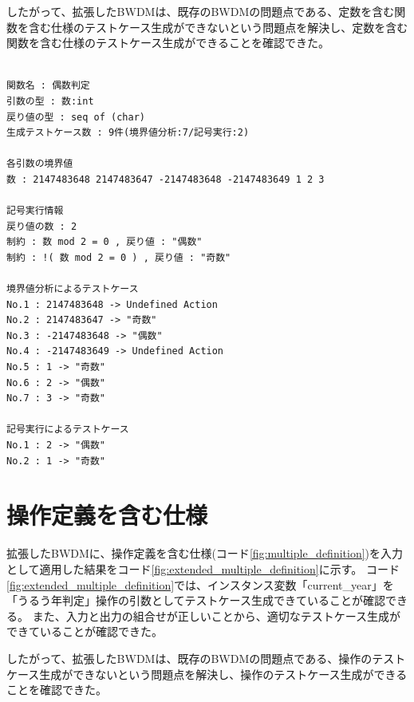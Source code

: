 \documentclass[uplatex, report, a4j, 10pt]{jsbook}
\begin{document}
したがって、拡張したBWDMは、既存のBWDMの問題点である、定数を含む関数を含む仕様のテストケース生成ができないという問題点を解決し、定数を含む関数を含む仕様のテストケース生成ができることを確認できた。

\lstset{language=}
\noindent\begin{minipage}{\textwidth}
  \begin{lstlisting}[caption=拡張したBWDMにコード\ref{fig:func_multiple}を適用した際の出力,label=fig:extended_value_definition_result]

関数名 : 偶数判定
引数の型 : 数:int 
戻り値の型 : seq of (char)
生成テストケース数 : 9件(境界値分析:7/記号実行:2)

各引数の境界値
数 : 2147483648 2147483647 -2147483648 -2147483649 1 2 3 

記号実行情報
戻り値の数 : 2
制約 : 数 mod 2 = 0 , 戻り値 : "偶数"
制約 : !( 数 mod 2 = 0 ) , 戻り値 : "奇数"

境界値分析によるテストケース
No.1 : 2147483648 -> Undefined Action
No.2 : 2147483647 -> "奇数"
No.3 : -2147483648 -> "偶数"
No.4 : -2147483649 -> Undefined Action
No.5 : 1 -> "奇数"
No.6 : 2 -> "偶数"
No.7 : 3 -> "奇数"

記号実行によるテストケース
No.1 : 2 -> "偶数"
No.2 : 1 -> "奇数"

\end{lstlisting}
\end{minipage}

\section{操作定義を含む仕様}
拡張したBWDMに、操作定義を含む仕様(コード\ref{fig:multiple_definition})を入力として適用した結果をコード\ref{fig:extended_multiple_definition}に示す。
コード\ref{fig:extended_multiple_definition}では、インスタンス変数「current\_year」を「うるう年判定」操作の引数としてテストケース生成できていることが確認できる。
また、入力と出力の組合せが正しいことから、適切なテストケース生成ができていることが確認できた。

したがって、拡張したBWDMは、既存のBWDMの問題点である、操作のテストケース生成ができないという問題点を解決し、操作のテストケース生成ができることを確認できた。
\end{document}
